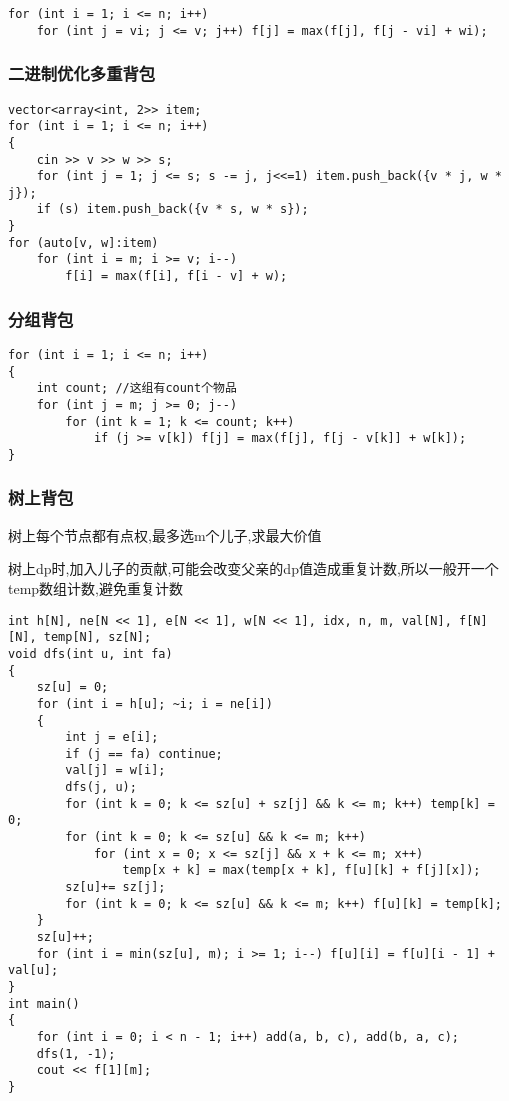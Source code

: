 \documentclass[a4paper,fontset=none]{ctexart}
\begin{document}
\begin{verbatim}
for (int i = 1; i <= n; i++)
    for (int j = vi; j <= v; j++) f[j] = max(f[j], f[j - vi] + wi);
\end{verbatim}

\subsubsection{二进制优化多重背包}

\begin{verbatim}
vector<array<int, 2>> item;
for (int i = 1; i <= n; i++)
{
    cin >> v >> w >> s;
    for (int j = 1; j <= s; s -= j, j<<=1) item.push_back({v * j, w * j});
    if (s) item.push_back({v * s, w * s});
}
for (auto[v, w]:item)
    for (int i = m; i >= v; i--)
        f[i] = max(f[i], f[i - v] + w);
\end{verbatim}
\subsubsection{分组背包}

\begin{verbatim}
for (int i = 1; i <= n; i++)
{
    int count; //这组有count个物品
    for (int j = m; j >= 0; j--)
        for (int k = 1; k <= count; k++)
            if (j >= v[k]) f[j] = max(f[j], f[j - v[k]] + w[k]);
}
\end{verbatim}
\subsubsection{树上背包}

树上每个节点都有点权,最多选m个儿子,求最大价值

树上dp时,加入儿子的贡献,可能会改变父亲的dp值造成重复计数,所以一般开一个temp数组计数,避免重复计数

\begin{verbatim}
int h[N], ne[N << 1], e[N << 1], w[N << 1], idx, n, m, val[N], f[N][N], temp[N], sz[N];
void dfs(int u, int fa)
{
    sz[u] = 0;
    for (int i = h[u]; ~i; i = ne[i])
    {
        int j = e[i];
        if (j == fa) continue;
        val[j] = w[i];
        dfs(j, u);
        for (int k = 0; k <= sz[u] + sz[j] && k <= m; k++) temp[k] = 0;
        for (int k = 0; k <= sz[u] && k <= m; k++)
            for (int x = 0; x <= sz[j] && x + k <= m; x++)
                temp[x + k] = max(temp[x + k], f[u][k] + f[j][x]);
        sz[u]+= sz[j];
        for (int k = 0; k <= sz[u] && k <= m; k++) f[u][k] = temp[k];
    }
    sz[u]++;
    for (int i = min(sz[u], m); i >= 1; i--) f[u][i] = f[u][i - 1] + val[u];
}
int main()
{
    for (int i = 0; i < n - 1; i++) add(a, b, c), add(b, a, c);
    dfs(1, -1);
    cout << f[1][m];
}
\end{verbatim}
\end{document}
